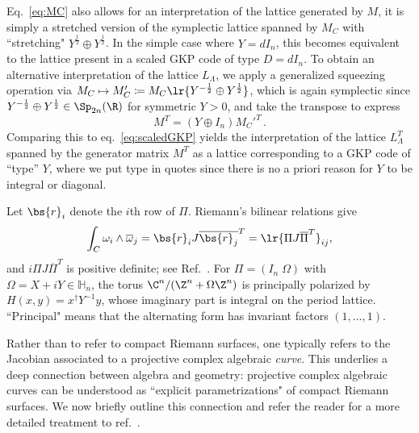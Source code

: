 \documentclass[a4paper, aps, pra, 11pt, onecolumn, tightenlines, superscriptaddress]{revtex4-2}
\begin{document}
Eq.~\eqref{eq:MC} also allows for an interpretation of the lattice generated by $M$, it is simply a stretched version of the symplectic lattice spanned by $M_C$ with ``stretching" $Y^{\frac{1}{2}}\oplus Y^{\frac{1}{2}}$. In the simple case where $Y=dI_n$, this becomes equivalent to the lattice present in a scaled GKP code of type $D=dI_n$. %
%
To obtain an alternative interpretation of the lattice $L_{\Lambda}$, we apply a generalized squeezing operation via $M_C\mapsto M_C'\coloneqq M_C\lr{Y^{-\frac{1}{2}} \oplus Y^{\frac{1}{2}}}$, which is again symplectic since $Y^{-\frac{1}{2}} \oplus Y^{\frac{1}{2}}\in\Sp_{2n}(\R)$ for symmetric $Y>0$,
and take the transpose to express
\begin{equation}
    M^T=(Y\oplus I_n) M_C'^T\,.
\end{equation}
Comparing this to eq.~\eqref{eq:scaledGKP} yields the interpretation of the lattice $L_{\Lambda}^T$ spanned by the generator matrix $M^T$ as a lattice corresponding to a GKP code of ``type'' $Y$, where we put type in quotes since there is no a priori reason for $Y$ to be integral or diagonal.

Let $\bs{r}_i$ denote the $i$th row of $\Pi$. Riemann's bilinear relations give
\begin{equation}
    \int_C\omega_i\wedge\overline{\omega}_j
    =\bs{r}_iJ\overline{\bs{r}_j}^{T}
    =\lr{\Pi J\overline{\Pi}^{T}}_{ij},
\end{equation}
and $i\Pi J\overline{\Pi}^{T}$ is positive definite; see Ref.~\cite[Ch.~4]{Birkenhake_2004}.
%
For $\Pi=(I_n\;\Omega)$ with $\Omega=X+iY\in\mathbb H_n$, the torus $\C^n/(\Z^n+\Omega\Z^n)$ is principally polarized by $H(x,y)=x^\dagger Y^{-1}y$, whose imaginary part is integral on the period lattice. ``Principal" means that the alternating form has invariant factors $(1,\ldots,1)$. %

Rather than to refer to compact Riemann surfaces, one typically refers to the Jacobian associated to a projective complex algebraic \emph{curve}. 
This underlies a deep connection between algebra and geometry: projective complex algebraic curves can be understood as ``explicit parametrizations" of compact Riemann surfaces. 
We now briefly outline this connection and refer the reader for a more detailed treatment to ref.~\cite{Griffiths1989, Bobenko2011}.
\end{document}
